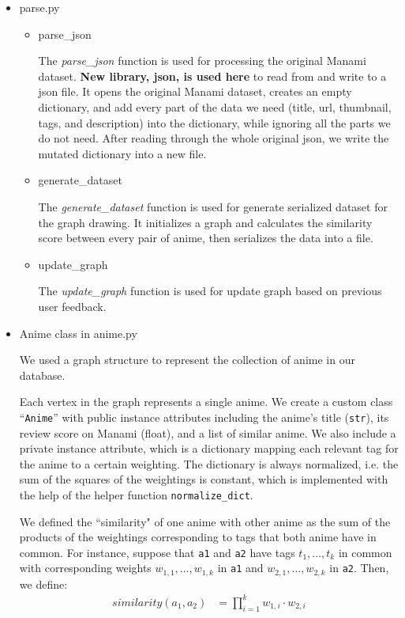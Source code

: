 \documentclass[12pt]{article}
\begin{document}
\begin{enumerate}
\begin{text}
\begin{itemize}
    \item parse.py
    \begin{itemize}
        \item parse\_json
        
            The \emph{parse\_json} function is used for processing the original Manami dataset. \textbf{New library, json, is used here} to read from and write to a json file. It opens the original Manami dataset, creates an empty dictionary, and add every part of the data we need (title, url, thumbnail, tags, and description) into the dictionary, while ignoring all the parts we do not need. After reading through the whole original json, we write the mutated dictionary into a new file.
            
        \item generate\_dataset
        
            The \emph{generate\_dataset} function is used for generate serialized dataset for the graph drawing. It initializes a graph and calculates the similarity score between every pair of anime, then serializes the data into a file.
            
        
        \item update\_graph
        
            The \emph{update\_graph} function is used for update graph based on previous user feedback.

    \end{itemize}

    
    \item Anime class in anime.py
    
    We used a graph structure to represent the collection of anime in our database. 
    
    Each vertex in the graph represents a single anime. We create a custom class “\texttt{Anime}” with public instance attributes including the anime's title (\texttt{str}), its review score on Manami (float), and a list of similar anime. We also include a private instance attribute, which is a dictionary mapping each relevant tag for the anime to a certain weighting. The dictionary is always normalized, i.e. the sum of the squares of the weightings is constant, which is implemented with the help of the helper function \texttt{normalize\_dict}. 
    
    We defined the ``similarity" of one anime with other anime as the sum of the products of the weightings corresponding to tags that both anime have in common. For instance, suppose that \texttt{a1} and \texttt{a2} have tags $t_1, \ldots, t_k$ in common with corresponding weights $w_{1,1}, \ldots, w_{1,k}$ in \texttt{a1} and $w_{2,1}, \ldots, w_{2,k}$ in \texttt{a2}. Then, we define:
    \begin{align*}
        similarity(a_1, a_2) &= \prod_{i=1}^k w_{1, i} \cdot w_{2, i}
    \end{align*}
    

\end{itemize}
\end{text}
\end{enumerate}
\end{document}
